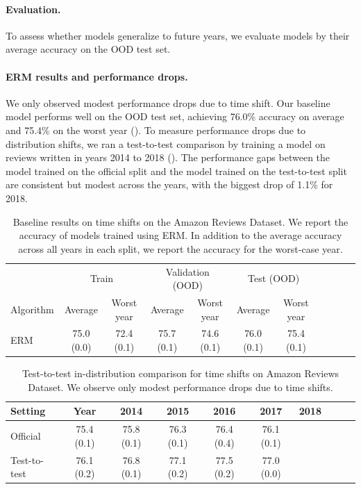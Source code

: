 \paragraph{Evaluation.}
To assess whether models generalize to future years, we evaluate models by their average accuracy on the OOD test set.

\paragraph{ERM results and performance drops.}
We only observed modest performance drops due to time shift.
Our baseline model performs well on the OOD test set, achieving 76.0\% accuracy on average and 75.4\% on the worst year ().
To measure performance drops due to distribution shifts, we ran a test-to-test comparison by training a model on reviews written in years 2014 to 2018 ().
The performance gaps between the model trained on the official split and the model trained on the test-to-test split are consistent but modest across the years, with the biggest drop of 1.1\% for 2018.

\begin{table}[tbp]
  \caption{Baseline results on time shifts on the Amazon Reviews Dataset. We report the accuracy of models trained using ERM. In addition to the average accuracy across all years in each split, we report the accuracy for the worst-case year.}\label{tab:results_amazon_time}
  \centering
  \begin{tabular}{lcccccccccc}
  \toprule
   & \multicolumn{2}{c}{Train} & \multicolumn{2}{c}{Validation (OOD)} & \multicolumn{2}{c}{Test (OOD)} \\
  Algorithm & Average & Worst year & Average & Worst year & Average & Worst year \\
  \midrule
    ERM	& 75.0 (0.0)	& 72.4 (0.1)	& 75.7 (0.1)	& 74.6 (0.1)	& 76.0 (0.1)	& 75.4 (0.1) \\
  \bottomrule
  \end{tabular}
\end{table}

\begin{table}[tbp]
  \caption{Test-to-test in-distribution comparison for time shifts on Amazon Reviews Dataset. We observe only modest performance drops due to time shifts.}\label{tab:compare_amazon_time}
  \centering
  \begin{tabular}{lccccccccc}
  \toprule
  Setting & Year & 2014 & 2015 & 2016 & 2017 & 2018 \\
  \midrule
  Official & 75.4 (0.1) & 75.8 (0.1) & 76.3 (0.1) & 76.4 (0.4) & 76.1 (0.1) \\
  Test-to-test & 76.1 (0.2) & 76.8 (0.1) & 77.1 (0.2) & 77.5 (0.2) & 77.0 (0.0) \\
  \bottomrule
  \end{tabular}
\end{table}

